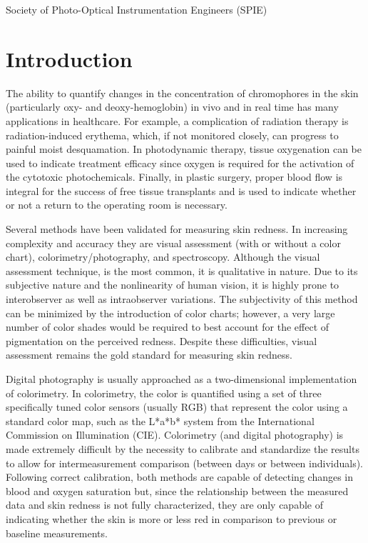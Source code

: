 \noindent {} Society of Photo-Optical Instrumentation Engineers (SPIE)

\section{Introduction}
The ability to quantify changes in the concentration of chromophores in the skin (particularly oxy- and deoxy-hemoglobin) in vivo and in real time has many applications in healthcare. For example, a complication of radiation therapy is radiation-induced erythema, which, if not monitored closely, can progress to painful moist desquamation.\cite{Hopewell1990,Russell1994,Nystrom2004,Fitzgerald2008} In photodynamic therapy, tissue oxygenation can be used to indicate treatment efficacy\cite{Woodhams2007} since oxygen is required for the activation of the cytotoxic photochemicals.\cite{Patterson1989a,Wilson2008} Finally, in plastic surgery, proper blood flow is integral for the success of free tissue transplants and is used to indicate whether or not a return to the operating room is necessary.\cite{Steele2011}

Several methods have been validated for measuring skin redness. In increasing complexity and accuracy they are visual assessment (with or without a color chart), colorimetry/photography, and spectroscopy.\cite{Agache2004} Although the visual assessment technique,\cite{Trotti2003} is the most common, it is qualitative in nature. Due to its subjective nature and the nonlinearity of human vision, it is highly prone to interobserver as well as intraobserver variations.\cite{Bodekaer2013} The subjectivity of this method can be minimized by the introduction of color charts; however, a very large number of color shades would be required to best account for the effect of pigmentation on the perceived redness. Despite these difficulties, visual assessment remains the gold standard for measuring skin redness.\cite{Basketter1997,Wengstrom2004}

Digital photography is usually approached as a two-dimensional implementation of colorimetry. In colorimetry, the color is quantified using a set of three specifically tuned color sensors (usually RGB) that represent the color using a standard color map, such as the L*a*b* system from the International Commission on Illumination (CIE).\cite{CI2012} Colorimetry (and digital photography) is made extremely difficult by the necessity to calibrate and standardize the results to allow for intermeasurement comparison (between days or between individuals).\cite{Jung2012} Following correct calibration, both methods are capable of detecting changes in blood and oxygen saturation but, since the relationship between the measured data and skin redness is not fully characterized, they are only capable of indicating whether the skin is more or less red in comparison to previous or baseline measurements.\cite{Kollias2002,Canning2009,Nishidate2011,Setaro2002}


